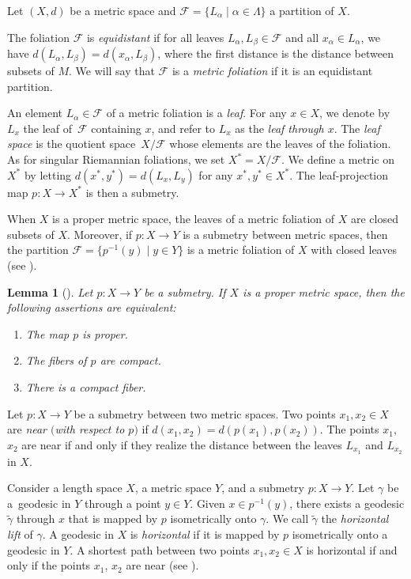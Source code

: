 \documentclass[pdftex]{sigma}
\numberwithin{equation}{section}
\newtheorem{lem}[thm]{Lemma}
\theoremstyle{definition}
\newcommand{\fol}{\mathcal{F}}
\begin{document}
Let $(X,d)$ be a metric space and $\fol = \{L_\alpha\mid \alpha\in \Lambda\}$ a partition of $X$.

The foliation $\fol$ is \emph{equidistant} if for all leaves $L_\alpha,L_\beta\in \fol$ and all $x_\alpha \in L_\alpha$, we have $d(L_\alpha,L_\beta) = d(x_\alpha,L_\beta)$, where the first distance is the distance between subsets of $M$.
We will say that $\fol$ is a \emph{metric foliation} if it is an equidistant partition.
	
An element $L_\alpha\in \fol$ of a metric foliation is a \emph{leaf}. For any $x\in X$, we denote by $L_x$ the leaf of~$\fol$ containing $x$, and refer to $L_x$ as the \emph{leaf through $x$}. The \emph{leaf space} is the quotient space~${X/\fol}$ whose elements are the leaves of the foliation. As for singular Riemannian foliations, we set $X^* = X/\fol$. We define a metric on $X^*$ by letting $d(x^*,y^*) = d(L_x,L_y)$ for any $x^*,y^*\in X^*$. The leaf-projection map $p\colon X\to X^*$ is then a submetry.
	
When $X$ is a proper metric space, the leaves of a metric foliation of $X$ are closed subsets of $X$. Moreover, if $p\colon X\to Y$ is a submetry between metric spaces, then the partition $\fol = \big\{p^{-1}(y)\mid y\in Y\big\}$ is a metric foliation of $X$ with closed leaves (see \cite[p.~19]{Lytchak}).

\begin{lem}[]
\label{L: characterization proper submetries}
Let $p\colon X\to Y$ be a submetry. If $X$ is a proper metric space, then the following assertions are equivalent:
\begin{enumerate}\itemsep=0pt
		\item[$(1)$] The map $p$ is proper.
		\item[$(2)$] The fibers of $p$ are compact.
		\item[$(3)$] There is a compact fiber.
\end{enumerate}
\end{lem}

	
Let $p\colon X	\to Y$ be a submetry between two metric spaces. Two points $x_1,x_2\in X$ are \emph{near $($with respect to $p)$} if $d(x_1,x_2) = d(p(x_1),p(x_2))$. The points $x_1$, $x_2$ are near if and only if they realize the distance between the leaves $L_{x_1}$ and $L_{x_2}$ in $X$.
	
Consider a length space $X$, a metric space $Y$, and a submetry $p\colon X\to Y$. Let $\gamma$ be a~geodesic in $Y$ through a point $y\in Y$. Given $x\in p^{-1}(y)$, there exists a geodesic $\tilde{\gamma}$ through $x$ that is mapped by $p$ isometrically onto $\gamma$. We call $\tilde{\gamma}$ the \emph{horizontal lift} of $\gamma$.	A geodesic in $X$ is \emph{horizontal } if it is mapped by $p$ isometrically onto a geodesic in $Y$. A shortest path between two points $x_1,x_2\in X$ is horizontal if and only if the points $x_1$, $x_2$ are near (see \cite[p.~21]{Lytchak}).
	
\end{document}
